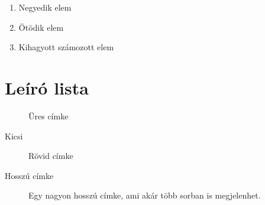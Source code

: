 \documentclass[12pt, twoside]{article}
\begin{document}
\lipsum[5]

\begin{enumerate}
    \item Negyedik elem
    \item Ötödik elem
    \item[ ] Kihagyott számozott elem
\end{enumerate}

\newpage

\section{Leíró lista}

\begin{description}
    \item[] Üres címke
    \lipsum[6]
    \item[Kicsi] Rövid címke
    \lipsum[7]
    \item[Hosszú címke] Egy nagyon hosszú címke, ami akár több sorban is megjelenhet.
    \lipsum[8]
\end{description}
\end{document}
